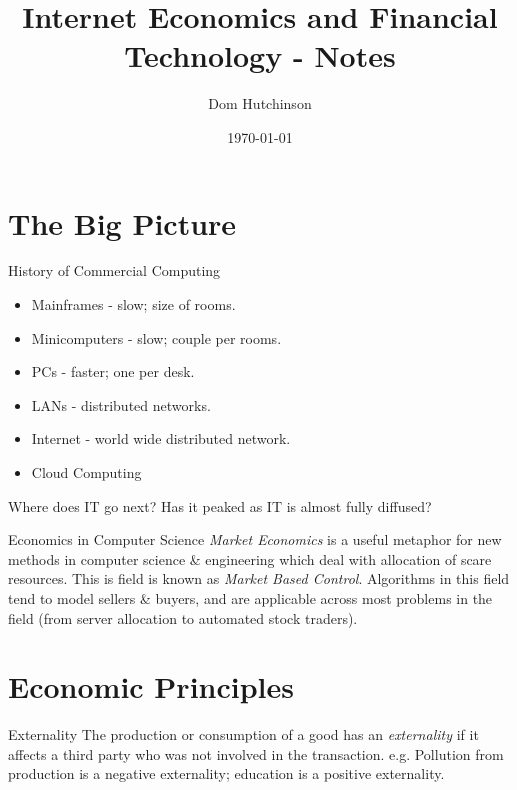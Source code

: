 \documentclass[11pt,a4paper]{article}
\begin{document}
\title{Internet Economics and Financial Technology - Notes}
\author{Dom Hutchinson}
\date{\today}
\maketitle

\tableofcontents\newpage

\section{The Big Picture}

\begin{remark}{History of Commercial Computing}
  \begin{itemize}
    \item[\textit{1950-60}] Mainframes - slow; size of rooms.
    \item[\textit{1960-70}] Minicomputers - slow; couple per rooms.
    \item[\textit{1970-80}] PCs - faster; one per desk.
    \item[\textit{1980-90}] LANs - distributed networks.
    \item[\textit{1990-10}] Internet - world wide distributed network.
    \item[\textit{2010-20}] Cloud Computing
  \end{itemize}
  Where does IT go next? Has it peaked as IT is almost fully diffused?
\end{remark}

\begin{remark}{Economics in Computer Science}
  \textit{Market Economics} is a useful metaphor for new methods in computer science \& engineering which deal with allocation of scare resources. This is field is known as \textit{Market Based Control}. Algorithms in this field tend to model sellers \& buyers, and are applicable across most problems in the field (from server allocation to automated stock traders).
\end{remark}

\section{Economic Principles}

\begin{definition}{Externality}
  The production or consumption of a good has an \textit{externality} if it affects a third party who was not involved in the transaction. e.g. Pollution from production is a negative externality; education is a positive externality.
\end{definition}
\end{document}
